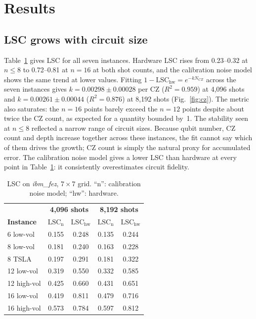 \documentclass[conference]{IEEEtran}
\newcommand{\LSC}{\mathrm{LSC}}
\begin{document}
\section{Results}
\label{sec:results}

\subsection{LSC grows with circuit size}
\label{sec:lsc-scaling}

Table~\ref{tab:lsc} gives LSC for all seven instances. Hardware LSC
rises from 0.23--0.32 at $n{\le}8$ to 0.72--0.81 at $n{=}16$ at both
shot counts, and the calibration noise model shows the same trend at
lower values. Fitting $1-\LSC_\mathrm{hw} = e^{-k N_{CZ}}$ across the
seven instances gives $k = 0.00298 \pm 0.00028$ per CZ ($R^2{=}0.959$)
at 4{,}096 shots and $k = 0.00261 \pm 0.00044$ ($R^2{=}0.876$) at 8{,}192
shots (Fig.~\ref{fig:cz}). The metric also saturates: the $n{=}16$
points barely exceed the $n{=}12$ points despite about twice the CZ
count, as expected for a quantity bounded by~1. The stability seen at
$n{\le}8$ reflected a narrow range of circuit sizes. Because qubit
number, CZ count and depth increase together across these instances,
the fit cannot say which of them drives the growth; CZ count is simply
the natural proxy for accumulated error. The calibration noise model
gives a lower LSC than hardware at every point in Table~\ref{tab:lsc}:
it consistently overestimates circuit fidelity.

\begin{table}[htbp]
\caption{LSC on \textit{ibm\_fez}, $7{\times}7$ grid. ``n'': calibration
noise model; ``hw'': hardware.}
\label{tab:lsc}
\begin{center}
\begin{tabular}{@{}lcccc@{}}
\toprule
& \multicolumn{2}{c}{\textbf{4{,}096 shots}} & \multicolumn{2}{c}{\textbf{8{,}192 shots}} \\
\textbf{Instance} & $\LSC_\mathrm{n}$ & $\LSC_\mathrm{hw}$ & $\LSC_\mathrm{n}$ & $\LSC_\mathrm{hw}$ \\
\midrule
6 low-vol   & 0.155 & 0.248 & 0.135 & 0.244 \\
8 low-vol   & 0.181 & 0.240 & 0.163 & 0.228 \\
8 TSLA      & 0.197 & 0.291 & 0.181 & 0.322 \\
12 low-vol  & 0.319 & 0.550 & 0.332 & 0.585 \\
12 high-vol & 0.425 & 0.660 & 0.431 & 0.651 \\
16 low-vol  & 0.419 & 0.811 & 0.479 & 0.716 \\
16 high-vol & 0.573 & 0.784 & 0.597 & 0.812 \\
\bottomrule
\end{tabular}
\end{center}
\end{table}
\end{document}
